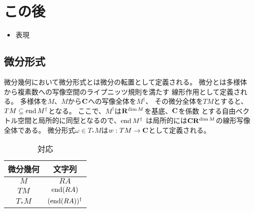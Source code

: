 \section{この後}\label{s1:この後} %
	\begin{itemize}\setlength{\itemsep}{-1mm} %
		\item 表現
	\end{itemize} %


	\subsection{微分形式}\label{s2:微分形式} %
		微分幾何において微分形式とは微分の転置として定義される。
		微分とは多様体から複素数への写像空間のライプニッツ規則を満たす
		線形作用として定義される。
		多様体を$M$、$M$から${\mathbf{C}}$への写像全体を$M^\dag$、
		その微分全体を$TM$とすると、$TM\subseteq \operatorname{end}M^\dag$となる。
		ここで、$M^\dag$は${\mathbf{R}}^{\operatorname{dim}M}$を基底、${\mathbf{C}}$を係数
		とする自由ベクトル空間と局所的に同型となるので、$\operatorname{end}M^\dag$
		は局所的には${\mathbf{C}}{\mathbf{R}}^{\operatorname{dim}M}$の線形写像全体である。
		微分形式$\omega\in T_*M$は$w:TM\to{\mathbf{C}}$として定義される。

		\begin{table}[htbp] %
			\begin{center}\begin{tabular}{cc} \hline
				微分幾何 & 文字列 \\ \hline
				$M$ & $RA$ \\ \hline
				$TM$ & $\operatorname{end}(RA)$ \\ \hline
				$T_*M$ & $(\operatorname{end}(RA))^\dag$ \\ \hline
			\end{tabular}\end{center}
			\caption{対応}
		\end{table} %
